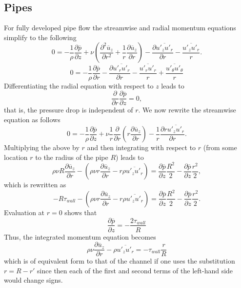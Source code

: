 \documentclass[oneside,a4paper,11pt]{report}
\newcommand{\pavg}{\overline{p}}
\newcommand{\uavg}{\overline{u}}
\newcommand{\ufluc}{u'}
\begin{document}
\subsection{Pipes}

For fully developed pipe flow the streamwise and radial momentum equations simplify to the following
\begin{equation}
0 =  -\frac{1}{\rho} \frac{\partial \pavg}{\partial z} + \nu \left ( \frac{\partial^2 \uavg_z}{\partial r^2} + \frac{1}{r} \frac{\partial \uavg_z}{\partial r} \right ) - \frac{\partial \overline{\ufluc_z \ufluc_r}}{\partial r} - \frac{\overline{\ufluc_z \ufluc_r}}{r}.
\end{equation}
\begin{equation}
0 = -\frac{1}{\rho} \frac{\partial \pavg}{\partial r} - \frac{\partial \overline{\ufluc_r \ufluc_r}}{\partial r} - \frac{\overline{\ufluc_r \ufluc_r}}{r} + \frac{\overline{\ufluc_\theta \ufluc_\theta}}{r}
\end{equation} 
Differentiating the radial equation with respect to $z$ leads to
\begin{equation}
\frac{\partial}{\partial r} \frac{\partial \pavg}{\partial z} = 0,
\end{equation}
that is, the pressure drop is independent of $r$. 
We now rewrite the streamwise equation as follows
\begin{equation}
0 =  -\frac{1}{\rho} \frac{\partial \pavg}{\partial z} + \nu \frac{1}{r} \frac{\partial}{\partial r} \left (r \frac{\partial \uavg_z}{\partial r} \right ) - \frac{1}{r} \frac{\partial r \overline{\ufluc_z \ufluc_r}}{\partial r}.
\end{equation}
Multiplying the above by $r$ and then integrating with respect to $r$ (from some location $r$ to the radius of the pipe $R$) leads to
\begin{equation}
\rho \nu R \frac{\partial \uavg_z}{\partial r} - \left ( \rho \nu r \frac{\partial \uavg_z}{\partial r} - r \rho \overline{ \ufluc_z \ufluc_r } \right )= \frac{\partial \pavg}{\partial z} \frac{R^2}{2} - \frac{\partial \pavg}{\partial z} \frac{r^2}{2},
\end{equation}
which is rewritten as
\begin{equation}
-R \tau_{wall} - \left ( \rho \nu r \frac{\partial \uavg_z}{\partial r} - r \rho \overline{\ufluc_z \ufluc_r} \right )= \frac{\partial \pavg}{\partial z} \frac{R^2}{2} - \frac{\partial \pavg}{\partial z} \frac{r^2}{2}.
\end{equation}
Evaluation at $r = 0$ shows that
\begin{equation}
\frac{\partial \pavg}{\partial z} = -\frac{2\tau_{wall}}{R}
\end{equation}
Thus, the integrated momentum equation becomes
\begin{equation}
\rho \nu \frac{\partial \uavg_z}{\partial r} - \rho \overline{\ufluc_z \ufluc_r} = -\tau_{wall} \frac{r}{R}
\end{equation}
which is of equivalent form to that of the channel if one uses the substitution $r = R - r'$ since then each of the first and second terms of the left-hand side would change signs. 
\end{document}
